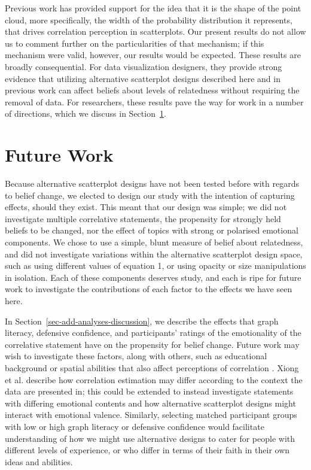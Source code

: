 \documentclass[manuscript,screen,review,anonymous]{acmart}
\begin{document}
Previous work has provided support for the idea that it is the shape of
the point cloud, more specifically, the width of the probability
distribution it represents, that drives correlation perception in
scatterplots. Our present results do not allow us to comment further on
the particularities of that mechanism; if this mechanism were valid,
however, our results would be expected. These results are broadly
consequential. For data visualization designers, they provide strong
evidence that utilizing alternative scatterplot designs described here
and in previous work can affect beliefs about levels of relatedness
without requiring the removal of data. For researchers, these results
pave the way for work in a number of directions, which we discuss in
Section~\ref{sec-future-work}.

\section{Future Work}\label{sec-future-work}

Because alternative scatterplot designs have not been tested before with
regards to belief change, we elected to design our study with the
intention of capturing effects, should they exist. This meant that our
design was simple; we did not investigate multiple correlative
statements, the propensity for strongly held beliefs to be changed, nor
the effect of topics with strong or polarised emotional components. We
chose to use a simple, blunt measure of belief about relatedness, and
did not investigate variations within the alternative scatterplot design
space, such as using different values of equation 1, or using opacity or
size manipulations in isolation. Each of these components deserves
study, and each is ripe for future work to investigate the contributions
of each factor to the effects we have seen here.

In Section~\ref{sec-add-analyses-discussion}, we describe the effects
that graph literacy, defensive confidence, and participants' ratings of
the emotionality of the correlative statement have on the propensity for
belief change. Future work may wish to investigate these factors, along
with others, such as educational background or spatial abilities that
also affect perceptions of correlation \citep{tandon_2024}. Xiong et al.
\citep{xiong_2022} describe how correlation estimation may differ
according to the context the data are presented in; this could be
extended to instead investigate statements with differing emotional
contents and how alternative scatterplot designs might interact with
emotional valence. Similarly, selecting matched participant groups with
low or high graph literacy or defensive confidence would facilitate
understanding of how we might use alternative designs to cater for
people with different levels of experience, or who differ in terms of
their faith in their own ideas and abilities.
\end{document}
